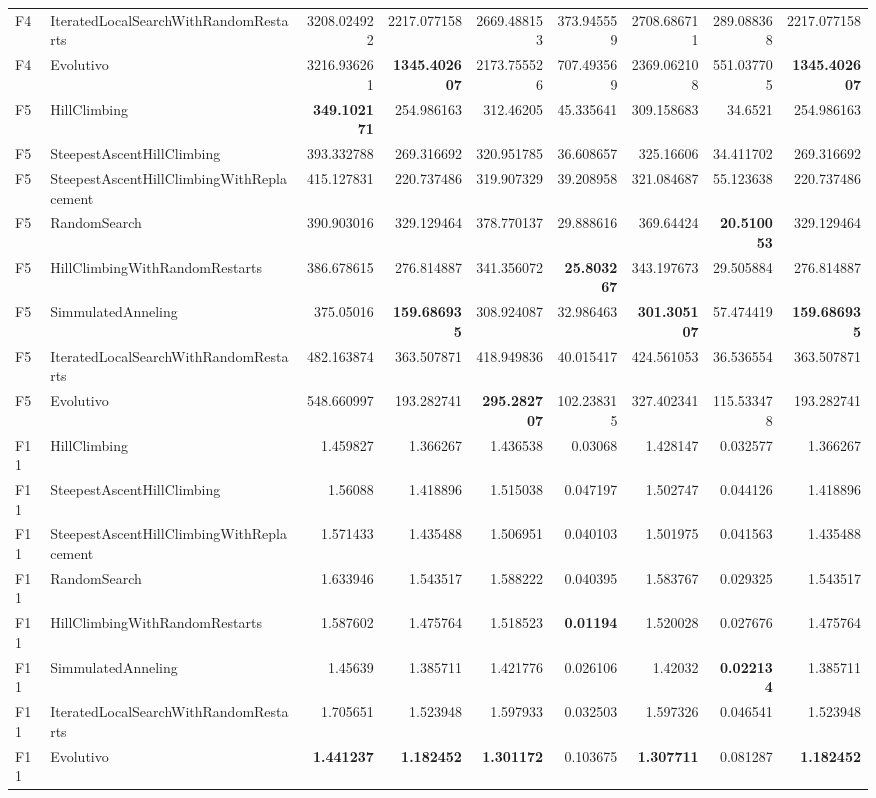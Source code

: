 \begin{tabular}{llrrrrrrr}
F4 & IteratedLocalSearchWithRandomRestarts & 3208.024922 & 2217.077158 & 2669.488153 & 373.945559 & 2708.686711 & 289.088368 & 2217.077158 \\ 
F4 & Evolutivo & 3216.936261 & \textbf{1345.402607} & 2173.755526 & 707.493569 & 2369.062108 & 551.037705 & \textbf{1345.402607} \\ 
\midrule
F5 & HillClimbing & \textbf{349.102171} & 254.986163 & 312.46205 & 45.335641 & 309.158683 & 34.6521 & 254.986163 \\ 
F5 & SteepestAscentHillClimbing & 393.332788 & 269.316692 & 320.951785 & 36.608657 & 325.16606 & 34.411702 & 269.316692 \\ 
F5 & SteepestAscentHillClimbingWithReplacement & 415.127831 & 220.737486 & 319.907329 & 39.208958 & 321.084687 & 55.123638 & 220.737486 \\ 
F5 & RandomSearch & 390.903016 & 329.129464 & 378.770137 & 29.888616 & 369.64424 & \textbf{20.510053} & 329.129464 \\ 
F5 & HillClimbingWithRandomRestarts & 386.678615 & 276.814887 & 341.356072 & \textbf{25.803267} & 343.197673 & 29.505884 & 276.814887 \\ 
F5 & SimmulatedAnneling & 375.05016 & \textbf{159.686935} & 308.924087 & 32.986463 & \textbf{301.305107} & 57.474419 & \textbf{159.686935} \\ 
F5 & IteratedLocalSearchWithRandomRestarts & 482.163874 & 363.507871 & 418.949836 & 40.015417 & 424.561053 & 36.536554 & 363.507871 \\ 
F5 & Evolutivo & 548.660997 & 193.282741 & \textbf{295.282707} & 102.238315 & 327.402341 & 115.533478 & 193.282741 \\ 
\midrule
F11 & HillClimbing & 1.459827 & 1.366267 & 1.436538 & 0.03068 & 1.428147 & 0.032577 & 1.366267 \\ 
F11 & SteepestAscentHillClimbing & 1.56088 & 1.418896 & 1.515038 & 0.047197 & 1.502747 & 0.044126 & 1.418896 \\ 
F11 & SteepestAscentHillClimbingWithReplacement & 1.571433 & 1.435488 & 1.506951 & 0.040103 & 1.501975 & 0.041563 & 1.435488 \\ 
F11 & RandomSearch & 1.633946 & 1.543517 & 1.588222 & 0.040395 & 1.583767 & 0.029325 & 1.543517 \\ 
F11 & HillClimbingWithRandomRestarts & 1.587602 & 1.475764 & 1.518523 & \textbf{0.01194} & 1.520028 & 0.027676 & 1.475764 \\ 
F11 & SimmulatedAnneling & 1.45639 & 1.385711 & 1.421776 & 0.026106 & 1.42032 & \textbf{0.022134} & 1.385711 \\ 
F11 & IteratedLocalSearchWithRandomRestarts & 1.705651 & 1.523948 & 1.597933 & 0.032503 & 1.597326 & 0.046541 & 1.523948 \\ 
F11 & Evolutivo & \textbf{1.441237} & \textbf{1.182452} & \textbf{1.301172} & 0.103675 & \textbf{1.307711} & 0.081287 & \textbf{1.182452} \\ 
\bottomrule
\end{tabular}
